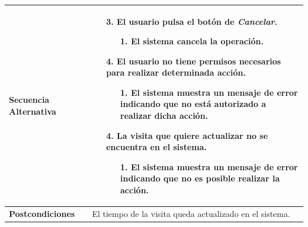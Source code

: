 \begin{longtable}{| p{4cm} | p{10cm} |}
\\
\hline
\textbf{Secuencia Alternativa} &\mbox{}\par\vspace{-\baselineskip}
\begin{enumerate}[leftmargin=0.9cm, topsep=0.1cm]
\item[3.] El usuario pulsa el botón de \textit{Cancelar}.
	\begin{itemize}
	\item[1.] El sistema cancela la operación.
	\end{itemize}
\item[4.] El usuario no tiene permisos necesarios para realizar determinada acción.
	\begin{itemize}
	\item[1.] El sistema muestra un mensaje de error indicando que no está autorizado a realizar dicha acción.
	\end{itemize}
\item[4.] La visita que quiere actualizar no se encuentra en el sistema.
	\begin{itemize}
	\item[1.] El sistema muestra un mensaje de error indicando que no es posible realizar la acción.
	\end{itemize}
\end{enumerate}
\\

\hline
\textbf{Postcondiciones} & 
El tiempo de la visita queda actualizado en el sistema.\\
\hline
\end{longtable}



\newpage
